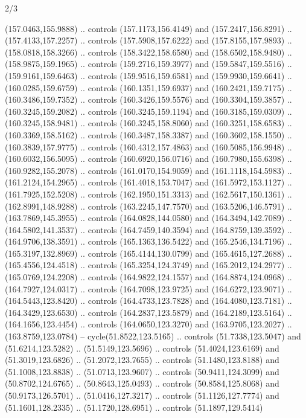 \begin{flagdescription}{2/3}
\begin{scope}[shift={(0.5\flaglength,0.5)},scale=\flagwidth/320]
\begin{scope}[y=0.8pt, x=0.8pt, yscale=-1,shift={(-118.3,-146)}]
  (157.0463,155.9888) .. controls (157.1173,156.4149) and (157.2417,156.8291) ..
  (157.4133,157.2257) .. controls (157.5908,157.6222) and (157.8155,157.9893) ..
  (158.0818,158.3266) .. controls (158.3422,158.6580) and (158.6502,158.9480) ..
  (158.9875,159.1965) .. controls (159.2716,159.3977) and (159.5847,159.5516) ..
  (159.9161,159.6463) .. controls (159.9516,159.6581) and (159.9930,159.6641) ..
  (160.0285,159.6759) .. controls (160.1351,159.6937) and (160.2421,159.7175) ..
  (160.3486,159.7352) .. controls (160.3426,159.5576) and (160.3304,159.3857) ..
  (160.3245,159.2082) .. controls (160.3245,159.1194) and (160.3185,159.0309) ..
  (160.3245,158.9481) .. controls (160.3245,158.8060) and (160.3251,158.6583) ..
  (160.3369,158.5162) .. controls (160.3487,158.3387) and (160.3602,158.1550) ..
  (160.3839,157.9775) .. controls (160.4312,157.4863) and (160.5085,156.9948) ..
  (160.6032,156.5095) .. controls (160.6920,156.0716) and (160.7980,155.6398) ..
  (160.9282,155.2078) .. controls (161.0170,154.9059) and (161.1118,154.5983) ..
  (161.2124,154.2965) .. controls (161.4018,153.7047) and (161.5972,153.1127) ..
  (161.7925,152.5208) .. controls (162.1950,151.3313) and (162.5617,150.1361) ..
  (162.8991,148.9288) .. controls (163.2245,147.7570) and (163.5206,146.5791) ..
  (163.7869,145.3955) .. controls (164.0828,144.0580) and (164.3494,142.7089) ..
  (164.5802,141.3537) .. controls (164.7459,140.3594) and (164.8759,139.3592) ..
  (164.9706,138.3591) .. controls (165.1363,136.5422) and (165.2546,134.7196) ..
  (165.3197,132.8969) .. controls (165.4144,130.0799) and (165.4615,127.2688) ..
  (165.4556,124.4518) .. controls (165.3254,124.3749) and (165.2012,124.2977) ..
  (165.0769,124.2208) .. controls (164.9822,124.1557) and (164.8874,124.0968) ..
  (164.7927,124.0317) .. controls (164.7098,123.9725) and (164.6272,123.9071) ..
  (164.5443,123.8420) .. controls (164.4733,123.7828) and (164.4080,123.7181) ..
  (164.3429,123.6530) .. controls (164.2837,123.5879) and (164.2189,123.5164) ..
  (164.1656,123.4454) .. controls (164.0650,123.3270) and (163.9705,123.2027) ..
  (163.8759,123.0784) -- cycle(51.8522,123.5165) .. controls (51.7338,123.5047)
  and (51.6214,123.5282) .. (51.5149,123.5696) .. controls (51.4024,123.6169)
  and (51.3019,123.6826) .. (51.2072,123.7655) .. controls (51.1480,123.8188)
  and (51.1008,123.8838) .. (51.0713,123.9607) .. controls (50.9411,124.3099)
  and (50.8702,124.6765) .. (50.8643,125.0493) .. controls (50.8584,125.8068)
  and (50.9173,126.5701) .. (51.0416,127.3217) .. controls (51.1126,127.7774)
  and (51.1601,128.2335) .. (51.1720,128.6951) .. controls (51.1897,129.5414)

\end{scope}
\end{scope}
\end{flagdescription}
